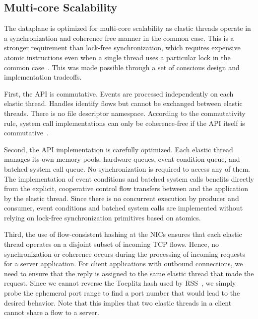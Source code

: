\subsection{Multi-core Scalability}
\label{sec:impl:cohfree}

The \ix dataplane is optimized for multi-core scalability as elastic
threads operate in a synchronization and coherence free manner in the
common case. This is a stronger requirement than lock-free
synchronization, which requires expensive atomic instructions even
when a single thread uses a particular lock in the common
case~\cite{DBLP:conf/sosp/DavidGT13}.  This was made possible 
through a set of conscious design and implementation tradeoffs. 

First, the \ix API is commutative. Events are processed independently
on each elastic thread. Handles identify flows but cannot be exchanged
between elastic threads. There is no file descriptor namespace.
According to the commutativity rule, system call implementations can
only be coherence-free if the API itself is
commutative~\cite{DBLP:conf/sosp/ClementsKZMK13}.

Second, the API implementation is carefully optimized.  Each elastic
thread manages its own memory pools, hardware queues, event condition
queue, and batched system call queue. No synchronization is required
to access any of them. The implementation of event conditions and
batched system calls benefits directly from the explicit, cooperative
control flow transfers between \ix and the application by the elastic
thread.  Since there is no concurrent execution by producer and
consumer, event conditions and batched system calls are implemented
without relying on lock-free synchronization primitives based
on atomics.

Third, the use of flow-consistent hashing at the NICs ensures that
each elastic thread operates on a disjoint subset of incoming TCP
flows. Hence, no synchronization or coherence occurs during the
processing of incoming requests for a server application. For client
applications with outbound connections, we need to ensure that the
reply is assigned to the same elastic thread that made the
request. Since we cannot reverse the Toeplitz hash used by RSS~\cite{url:rss}, we
simply probe the ephemeral port range to find a port number that
would lead to the desired behavior. Note that this implies that two
elastic threads in a client cannot share a flow to a server. %
 
